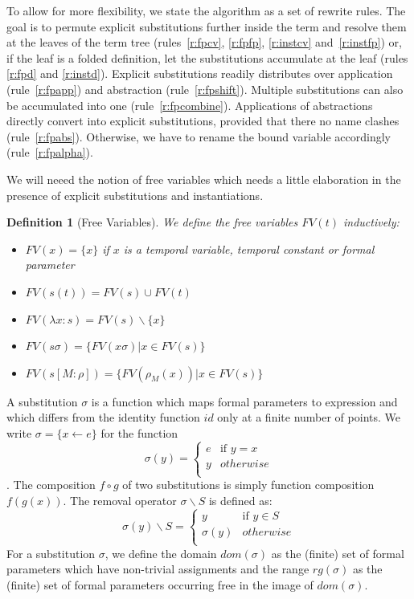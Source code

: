 \documentclass[a4paper]{article}
\newcommand{\set}[1]{\{#1\}}
\newcommand{\fpsubstin}[1]{\{#1\}}
\newcommand{\fpscat}[0]{\circ}
\newcommand{\substin}[2]{[#1:#2]}
\newcommand{\fpwith}{\leftarrow}
\newcommand{\fpwithout}[0]{\backslash}
\newcommand{\fpwithoutset}[1]{\backslash\{#1\}}
\newtheorem{definition}{Definition}
\begin{document}
To allow for more flexibility, we state the algorithm as a set of rewrite
rules. The goal is to permute explicit substitutions further inside the
term and resolve them at the leaves of the term tree (rules~\ref{r:fpcv},
\ref{r:fpfp}, \ref{r:instcv} and~\ref{r:instfp}) or,
if the leaf is a folded definition, let the substitutions accumulate at the
leaf (rules \ref{r:fpd} and \ref{r:instd}). Explicit substitutions readily
distributes over application (rule~\ref{r:fpapp}) and abstraction
(rule~\ref{r:fpshift}). Multiple substitutions can also be accumulated
into one (rule~\ref{r:fpcombine}).
Applications of abstractions directly convert into explicit
substitutions, provided that there no name clashes (rule~\ref{r:fpabs}).
Otherwise, we have to rename the bound variable accordingly
(rule~\ref{r:fpalpha}).


We will neeed the notion of free variables which needs a little elaboration
 in the presence of explicit substitutions and instantiations.

 \begin{definition}[Free Variables]
   We define the free variables $FV(t)$ inductively:
   \begin{itemize}
   \item $FV(x) = \set{x}$ if $x$ is a temporal variable, temporal constant or
     formal parameter
   \item $FV(s(t)) = FV(s) \cup FV(t)$
   \item $FV(\lambda x : s) = FV(s) \fpwithoutset{x}$
   \item $FV(s\sigma) = \set{FV(x\sigma) | x \in FV(s) }$
   \item $FV(s\substin{M}{\rho}) = \set{FV(\rho_M(x) ) | x \in FV(s)} $
   \end{itemize}
 \end{definition}

A substitution $\sigma$ is a function which maps formal parameters
to expression and which differs from the identity function $id$ only at a
finite number of points. We write $\sigma=\fpsubstin{x \fpwith e}$ for the
function
\[\sigma(y)=\left\{
    \begin{array}{ll}
      e& \mbox{if }y = x\\
      y & otherwise\\
    \end{array}\right.
\]. The composition $f \fpscat g$ of two substitutions is simply function
composition $f(g(x))$. The removal operator $\sigma\fpwithout S$ is defined
as:
\[\sigma(y)\fpwithout S = \left\{
    \begin{array}{ll}
      y &\mbox{if }y \in S\\
      \sigma(y) & otherwise\\
    \end{array}\right.
\]
For a substitution $\sigma$, we define the domain $dom(\sigma)$ as the (finite)
set of formal parameters which have non-trivial assignments and the range
$rg(\sigma)$ as the (finite) set of formal parameters occurring free in the
image of $dom(\sigma)$.
\end{document}
